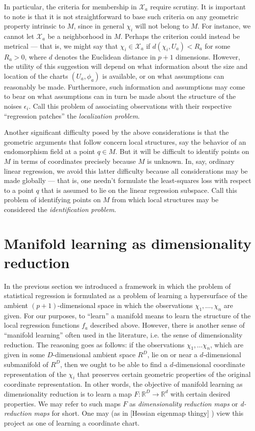 \documentclass[11pt]{article}
\newcommand{\gep}{\epsilon}
\newcommand{\R}{\ensuremath{\mathbb{R}}}
\numberwithin{equation}{section}
\begin{document}
In particular, the criteria for membership in $\mathcal{X}_a$ require scrutiny. It is important to note is that it is not straightforward to base such criteria on any geometric property intrinsic to $M$, since in general $\chi_i$ will not belong to $M$. For instance, we cannot let $\mathcal{X}_a$ be a neighborhood in $M$. Perhaps the criterion could instead be metrical --- that is, we might say that $\chi_i \in \mathcal{X}_a$ if $d(\chi_i, U_a) < R_a$ for some $R_a > 0$, where $d$ denotes the Euclidean distance in $p+1$ dimensions. However, the utility of this suggestion will depend on what information about the size and location of the charts $(U_a, \phi_a)$ is available, or on what assumptions can reasonably be made. Furthermore, such information and assumptions may come to bear on what assumptions can in turn be made about the structure of the noises $\gep_i$. Call this problem of associating observations with their respective ``regression patches'' the \emph{localization problem}.

Another significant difficulty posed by the above considerations is that the geometric arguments that follow concern local structures, say the behavior of an endomorphism field at a point $q \in M$. But it will be difficult to identify points on $M$ in terms of coordinates precisely because $M$ is unknown. In, say, ordinary linear regression, we avoid this latter difficulty because all considerations may be made globally --- that is, one needn't formulate the least-squares loss with respect to a point $q$ that is assumed to lie on the linear regression subspace. Call this problem of identifying points on $M$ from which local structures may be considered the \emph{identification problem}.



\section{Manifold learning as dimensionality reduction}

In the previous section we introduced a framework in which the problem of statistical regression is formulated as a problem of learning a hypersurface of the ambient $(p+1)$-dimensional space in which the observations $\chi_1, \ldots, \chi_n$ are given. For our purposes, to ``learn'' a manifold means to learn the structure of the local regression functions $f_a$ described above. However, there is another sense of ``manifold learning'' often used in the literature, i.e. the sense of dimensionality reduction. The reasoning goes as follows: if the observations $\chi_1, \ldots \chi_n$, which are given in some $D$-dimensional ambient space $R^D$, lie on or near a $d$-dimensional submanifold of $R^D$, then we ought to be able to find a $d$-dimensional coordinate representation of the $\chi_i$ that preserves certain geometric properties of the original coordinate representation. In other words, the objective of manifold learning as dimensionality reduction is to learn a map $F: \R^D \to \R^d$ with certain desired properties. We may refer to such maps $F$ as \emph{dimensionality reduction maps} or \emph{d-reduction maps} for short. One may (as in [Hessian eigenmap thingy] ) view this project as one of learning a coordinate chart.
\end{document}
